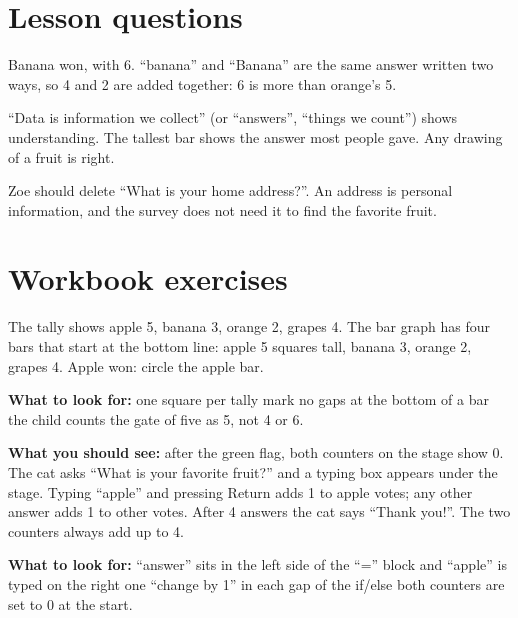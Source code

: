 
\section{Lesson questions}
\begin{answer}
Banana won, with 6. \enquote{banana} and \enquote{Banana} are the same answer written two ways, so 4 and 2 are added together: 6 is more than orange's 5.
\end{answer}

\begin{answer}[Reflection]
\enquote{Data is information we collect} (or \enquote{answers}, \enquote{things we count}) shows understanding. The tallest bar shows the answer most people gave. Any drawing of a fruit is right.
\end{answer}

\begin{answer}
Zoe should delete \enquote{What is your home address?}. An address is personal information, and the survey does not need it to find the favorite fruit.
\end{answer}

\section{Workbook exercises}
\begin{answer}
The tally shows apple 5, banana 3, orange 2, grapes 4. The bar graph has four bars that start at the bottom line: apple 5 squares tall, banana 3, orange 2, grapes 4. Apple won: circle the apple bar.

\textbf{What to look for:} \tickbox{} one square per tally mark \quad \tickbox{} no gaps at the bottom of a bar \quad \tickbox{} the child counts the gate of five as 5, not 4 or 6.
\end{answer}

\begin{answer}
\textbf{What you should see:} after the green flag, both counters on the stage show 0. The cat asks \enquote{What is your favorite fruit?} and a typing box appears under the stage. Typing \enquote{apple} and pressing Return adds 1 to apple votes; any other answer adds 1 to other votes. After 4 answers the cat says \enquote{Thank you!}. The two counters always add up to 4.

\textbf{What to look for:} \tickbox{} \enquote{answer} sits in the left side of the \enquote{=} block and \enquote{apple} is typed on the right \quad \tickbox{} one \enquote{change by 1} in each gap of the if/else \quad \tickbox{} both counters are set to 0 at the start.
\end{answer}

